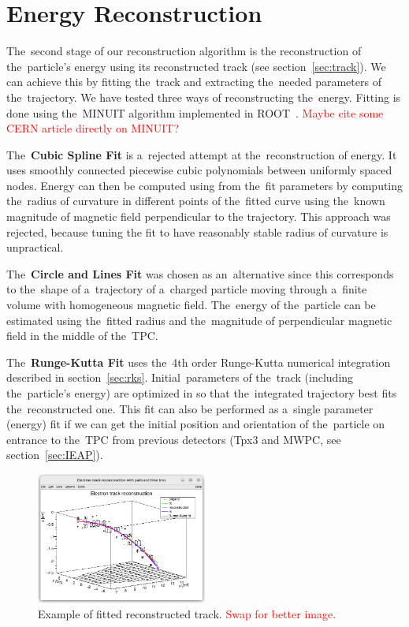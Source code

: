 \documentclass[]{article}
\begin{document}
	\section{Energy Reconstruction}
	\label{sec:energy}
		The~second stage of our reconstruction algorithm is the reconstruction of the~particle's energy using its reconstructed track (see section~\ref{sec:track}). We can achieve this by fitting the~track and extracting the~needed parameters of the~trajectory. We have tested three ways of reconstructing the~energy. Fitting is done using the~MINUIT algorithm implemented in ROOT~\cite{ROOT}. \textcolor{red}{Maybe cite some CERN article directly on MINUIT?}
		
		The~\textbf{Cubic Spline Fit} is a~rejected attempt at the~reconstruction of energy. It uses smoothly connected piecewise cubic polynomials between uniformly spaced nodes. Energy can then be computed using from the~fit parameters by computing the~radius of curvature in different points of the~fitted curve using the~known magnitude of magnetic field perpendicular to the trajectory. This approach was rejected, because tuning the fit to have reasonably stable radius of curvature is unpractical.
		
		The~\textbf{Circle and Lines Fit} was chosen as an~alternative since this corresponds to the~shape of a~trajectory of a~charged particle moving through a~finite volume with homogeneous magnetic field. The~energy of the~particle can be estimated using the~fitted radius and the~magnitude of perpendicular magnetic field in the middle of the~TPC.
		
		The~\textbf{Runge-Kutta Fit} uses the~4th order Runge-Kutta numerical integration described in section~\ref{sec:rks}. Initial~parameters of the~track (including the~particle's energy) are optimized in so that the~integrated trajectory best fits the~reconstructed one. This fit can also be performed as a~single parameter (energy) fit if we can get the initial position and orientation of the~particle on entrance to the~TPC from previous detectors (Tpx3 and MWPC, see section~\ref{sec:IEAP}).
		
		\begin{figure}
			\centering
			\includegraphics[width=0.5\textwidth]{9010_3d.png}
			\caption{Example of fitted reconstructed track. \textcolor{red}{Swap for better image.}}
			\label{fig:90103d}
		\end{figure}
		
\end{document}
